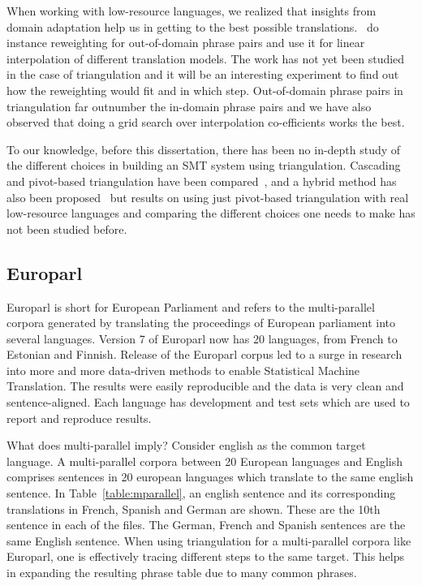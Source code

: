   When working with low-resource languages, we realized that insights from domain adaptation help us in getting to the best possible translations.~\cite{Foster:07} do instance reweighting for out-of-domain phrase pairs and use it for linear interpolation of different translation models. The work has not yet been studied in the case of triangulation and it will be an interesting experiment to find out how the reweighting would fit and in which step. Out-of-domain phrase pairs in triangulation far outnumber the in-domain phrase pairs and we have also observed that doing a grid search over interpolation co-efficients works the best. 


 To our knowledge, before this dissertation, there has been no in-depth study of the different choices in building an SMT system using triangulation. Cascading and pivot-based triangulation have been compared~\cite{Utiyama:07,Gispert:06}, and a hybrid method has also been proposed~\cite{Wu:09} but results on using just pivot-based triangulation with real low-resource languages and comparing the different choices one needs to make has not been studied before. 
\subsection{Europarl}
Europarl is short for European Parliament and refers to the multi-parallel corpora generated by translating the proceedings of European parliament into several languages. Version 7 of Europarl now has 20 languages, from French to Estonian and Finnish. Release of the Europarl corpus led to a surge in research into more and more data-driven methods to enable Statistical Machine Translation. The results were easily reproducible and the data is very clean and sentence-aligned. Each language has development and test sets which are used to report and reproduce results. 

What does multi-parallel imply? Consider english as the common target language. A multi-parallel corpora between 20 European languages and English comprises sentences in 20 european languages which translate to the same english sentence. In Table~\ref{table:mparallel}, an english sentence and its corresponding translations in French, Spanish and German are shown. These are the 10th sentence in each of the files. The German, French and Spanish sentences are the same English sentence. When using triangulation for a multi-parallel corpora like Europarl, one is effectively tracing different steps to the same target. This helps in expanding the resulting phrase table due to many common phrases. 

